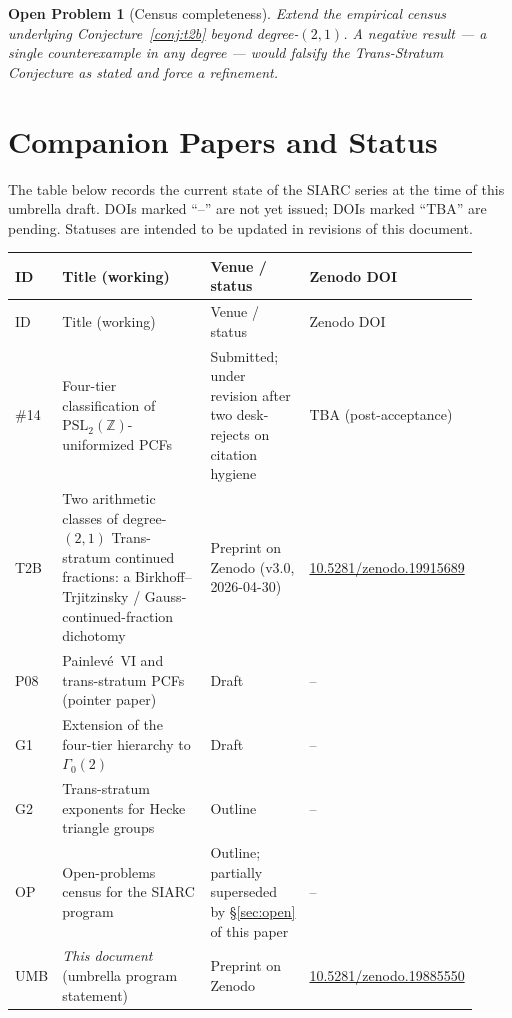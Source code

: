 \documentclass[11pt,a4paper]{article}
\newtheorem{problem}{Open Problem}
\theoremstyle{definition}
\theoremstyle{remark}
\newcommand{\PSLZ}{\mathrm{PSL}_2(\mathbb{Z})}
\begin{document}
\begin{problem}[Census completeness]
\label{prob:census}
Extend the empirical census underlying Conjecture~\ref{conj:t2b}
beyond degree-$(2,1)$. A negative result --- a single counterexample
in any degree --- would falsify the Trans-Stratum Conjecture as
stated and force a refinement.
\end{problem}

\section{Companion Papers and Status}
\label{sec:companions}

The table below records the current state of the SIARC series at
the time of this umbrella draft. DOIs marked ``--'' are not yet
issued; DOIs marked ``TBA'' are pending. Statuses are intended to be
updated in revisions of this document.

\begin{center}
\renewcommand{\arraystretch}{1.15}
\begin{longtable}{@{}p{0.08\linewidth} p{0.34\linewidth} p{0.22\linewidth} p{0.28\linewidth}@{}}
\toprule
ID & Title (working) & Venue / status & Zenodo DOI \\
\midrule
\endfirsthead
\toprule
ID & Title (working) & Venue / status & Zenodo DOI \\
\midrule
\endhead
\#14 & Four-tier classification of $\PSLZ$-uniformized PCFs & Submitted; under revision after two desk-rejects on citation hygiene & TBA (post-acceptance) \\
T2B  & Two arithmetic classes of degree-$(2,1)$ Trans-stratum continued fractions: a Birkhoff--Trjitzinsky / Gauss-continued-fraction dichotomy & Preprint on Zenodo (v3.0, 2026-04-30) & \href{https://doi.org/10.5281/zenodo.19915689}{10.5281/zenodo.19915689} \\
P08  & Painlevé~VI and trans-stratum PCFs (pointer paper) & Draft & -- \\
G1   & Extension of the four-tier hierarchy to $\Gamma_0(2)$ & Draft & -- \\
G2   & Trans-stratum exponents for Hecke triangle groups & Outline & -- \\
OP   & Open-problems census for the SIARC program & Outline; partially superseded by \S\ref{sec:open} of this paper & -- \\
UMB  & \emph{This document} (umbrella program statement) & Preprint on Zenodo & \href{https://doi.org/10.5281/zenodo.19885550}{10.5281/zenodo.19885550} \\
\bottomrule
\end{longtable}
\end{center}
\end{document}
